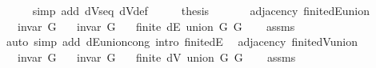 \begin{isabellebody}
\ \ \ \ \isamarkupfalse%
\ {\isacharparenleft}{\kern0pt}simp\ add{\isacharcolon}{\kern0pt}\ dVs{\isacharunderscore}{\kern0pt}eq\ dV{\isacharunderscore}{\kern0pt}def{\isacharparenright}{\kern0pt}\isanewline
\ \ \isamarkupfalse%
\ \isamarkupfalse%
\ {\isacharquery}{\kern0pt}thesis\isanewline
\ \ \ \ \isacommand{{\isachardot}{\kern0pt}}\isamarkupfalse%
\isanewline
{}\isamarkupfalse%
%
\endisatagproof
{\isafoldproof}%
%
\isadelimproof
\isanewline
%
\endisadelimproof
\isanewline
{}\isamarkupfalse%
\ {\isacharparenleft}{\kern0pt}\ adjacency{\isacharparenright}{\kern0pt}\ finite{\isacharunderscore}{\kern0pt}dE{\isacharunderscore}{\kern0pt}union{\isacharcolon}{\kern0pt}\isanewline
\ \ \ {\isachardoublequoteopen}invar\ G{}{\isachardoublequoteclose}\isanewline
\ \ \ {\isachardoublequoteopen}invar\ G{}{\isachardoublequoteclose}\isanewline
\ \ \ {\isachardoublequoteopen}finite\ {\isacharparenleft}{\kern0pt}dE\ {\isacharparenleft}{\kern0pt}union\ G{}\ G{}{\isacharparenright}{\kern0pt}{\isacharparenright}{\kern0pt}{\isachardoublequoteclose}\isanewline
%
\isadelimproof
\ \ %
\endisadelimproof
%
\isatagproof
{}\isamarkupfalse%
\ assms\isanewline
\ \ \isamarkupfalse%
\ {\isacharparenleft}{\kern0pt}auto\ simp\ add{\isacharcolon}{\kern0pt}\ dE{\isacharunderscore}{\kern0pt}union{\isacharunderscore}{\kern0pt}cong\ intro{\isacharcolon}{\kern0pt}\ finite{\isacharunderscore}{\kern0pt}dE{\isacharparenright}{\kern0pt}%
\endisatagproof
{\isafoldproof}%
%
\isadelimproof
\isanewline
%
\endisadelimproof
\isanewline
{}\isamarkupfalse%
\ {\isacharparenleft}{\kern0pt}\ adjacency{\isacharparenright}{\kern0pt}\ finite{\isacharunderscore}{\kern0pt}dV{\isacharunderscore}{\kern0pt}union{\isacharcolon}{\kern0pt}\isanewline
\ \ \ {\isachardoublequoteopen}invar\ G{}{\isachardoublequoteclose}\isanewline
\ \ \ {\isachardoublequoteopen}invar\ G{}{\isachardoublequoteclose}\isanewline
\ \ \ {\isachardoublequoteopen}finite\ {\isacharparenleft}{\kern0pt}dV\ {\isacharparenleft}{\kern0pt}union\ G{}\ G{}{\isacharparenright}{\kern0pt}{\isacharparenright}{\kern0pt}{\isachardoublequoteclose}\isanewline
%
\isadelimproof
\ \ %
\endisadelimproof
%
\isatagproof
{}\isamarkupfalse%
\ assms\isanewline
\ \ \isamarkupfalse%

\end{isabellebody}
